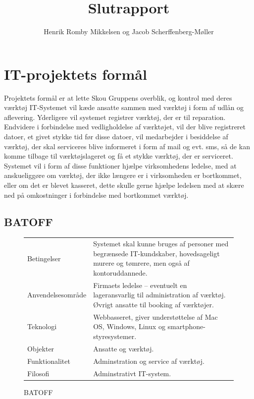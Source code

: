 \documentclass{article}
\title{Slutrapport}
\author{Henrik Romby Mikkelsen og Jacob Scherffenberg-Møller}
\begin{document}
\maketitle
\tableofcontents
\pagebreak

\section{IT-projektets formål}

Projektets formål er at lette Skou Gruppens overblik, og kontrol med deres værktøj IT-Systemet vil kæde ansatte sammen med værktøj i form af udlån og aflevering. Yderligere vil systemet registrer værktøj, der er til reparation. Endvidere i forbindelse med vedligholdelse af værktøjet, vil der blive registreret datoer, et givet stykke tid før disse datoer, vil medarbejder i besiddelse af værktøj, der skal serviceres blive informeret i form af mail og evt. sms, så de kan komme tilbage til værktøjslageret og få et stykke værktøj, der er serviceret. 
Systemet vil i form af disse funktioner hjælpe virksomhedens ledelse, med at anskueliggøre om værktøj, der ikke længere er i virksomheden er bortkommet, eller om det er blevet kasseret, dette skulle gerne hjælpe ledelsen med at skære ned på omkostninger i forbindelse med bortkommet værktøj. 

\subsection{BATOFF}
\begin{figure}[htbp]
\begin{tabular}{ l p{8cm} }
\hline
Betingelser & Systemet skal kunne bruges af personer med begrænsede IT-kundskaber, hovedsageligt murere og tømrere, men også af kontoruddannede. \\
Anvendelsesområde & Firmaets ledelse -- eventuelt en lageransvarlig til administration af værktøj. Øvrigt ansatte til booking af værktøjer.  \\
Teknologi & Webbasseret, giver understøttelse af Mac OS, Windows, Linux og smartphone-styresystemer. \\
Objekter & Ansatte og værktøj. \\
Funktionalitet & Adminstration og service af værktøj.  \\
Filosofi & Adminstrativt IT-system. \\
\hline
\end{tabular}
\caption{BATOFF}
\end{figure}
\end{document}
